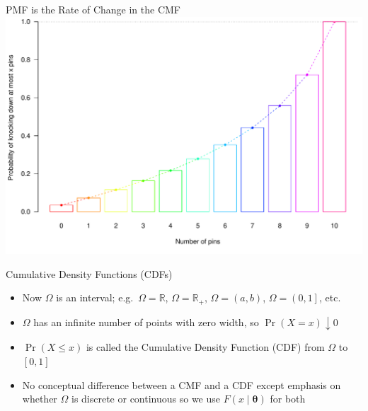 \documentclass[
  ignorenonframetext,
]{beamer}
\providecommand{\tightlist}{%
  \setlength{\itemsep}{0pt}\setlength{\parskip}{0pt}}
\begin{document}
\begin{frame}{PMF is the Rate of Change in the CMF}
\protect\hypertarget{pmf-is-the-rate-of-change-in-the-cmf}{}
\includegraphics{Slides04_files/figure-beamer/unnamed-chunk-2-1.pdf}
\end{frame}

\begin{frame}{Cumulative Density Functions (CDFs)}
\protect\hypertarget{cumulative-density-functions-cdfs}{}
\begin{itemize}
\tightlist
\item
  Now \(\Omega\) is an interval; e.g.~\(\Omega=\mathbb{R}\),
  \(\Omega=\mathbb{R}_{+}\), \(\Omega=\left(a,b\right)\),
  \(\Omega=\left(0,1\right]\), etc.
\item
  \(\Omega\) has an infinite number of points with zero width, so
  \(\Pr\left(X = x\right) \downarrow 0\)
\item
  \(\Pr\left(X\leq x\right)\) is called the Cumulative Density Function
  (CDF) from \(\Omega\) to \(\left[0,1\right]\)
\item
  No conceptual difference between a CMF and a CDF except emphasis on
  whether \(\Omega\) is discrete or continuous so we use
  \(F\left(x \mid \boldsymbol{\theta}\right)\) for both
\end{itemize}
\end{frame}
\end{document}
